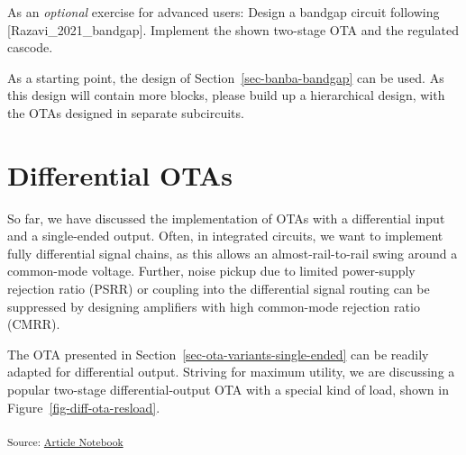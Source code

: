 \documentclass[
  a4paper,
  DIV=11,
  numbers=noendperiod]{scrartcl}
\begin{document}
\begin{tcolorbox}[enhanced jigsaw, breakable, opacitybacktitle=0.6, arc=.35mm, coltitle=black, toprule=.15mm, colback=white, leftrule=.75mm, bottomrule=.15mm, left=2mm, colframe=quarto-callout-tip-color-frame, colbacktitle=quarto-callout-tip-color!10!white, titlerule=0mm, title=\textcolor{quarto-callout-tip-color}{\faLightbulb}\hspace{0.5em}{Exercise: Improved Low-Voltage Bandagap}, rightrule=.15mm, bottomtitle=1mm, toptitle=1mm, opacityback=0]

As an \emph{optional} exercise for advanced users: Design a bandgap
circuit following {[}Razavi\_2021\_bandgap{]}. Implement the shown
two-stage OTA and the regulated cascode.

As a starting point, the design of Section~\ref{sec-banba-bandgap} can
be used. As this design will contain more blocks, please build up a
hierarchical design, with the OTAs designed in separate subcircuits.

\end{tcolorbox}

\section{Differential OTAs}\label{sec-differential-ota}

So far, we have discussed the implementation of OTAs with a differential
input and a single-ended output. Often, in integrated circuits, we want
to implement fully differential signal chains, as this allows an
almost-rail-to-rail swing around a common-mode voltage. Further, noise
pickup due to limited power-supply rejection ratio (PSRR) or coupling
into the differential signal routing can be suppressed by designing
amplifiers with high common-mode rejection ratio (CMRR).

The OTA presented in Section~\ref{sec-ota-variants-single-ended} can be
readily adapted for differential output. Striving for maximum utility,
we are discussing a popular two-stage differential-output OTA with a
special kind of load, shown in Figure~\ref{fig-diff-ota-resload}.

\textsubscript{Source:
\href{https://iic-jku.github.io/analog-circuit-design/index.qmd.html}{Article
Notebook}}
\end{document}
